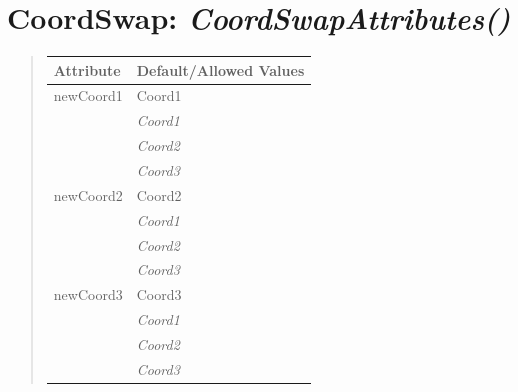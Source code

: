 \documentclass[letterpaper,10pt,english]{sphinxmanual}
\begin{document}
\section{\textbf{CoordSwap}: \emph{CoordSwapAttributes()}}
\label{attributes:coordswap-coordswapattributes}
\begin{DUlineblock}{0em}
\item[] 
\end{DUlineblock}
\begin{quote}

\begin{tabulary}{\linewidth}{|L|L|}
\hline

\textbf{Attribute}
 & 
\textbf{Default/Allowed Values}
\\
\hline
newCoord1
 & 
Coord1
\\
\hline & 
\emph{Coord1}
\\
\hline & 
\emph{Coord2}
\\
\hline & 
\emph{Coord3}
\\
\hline
newCoord2
 & 
Coord2
\\
\hline & 
\emph{Coord1}
\\
\hline & 
\emph{Coord2}
\\
\hline & 
\emph{Coord3}
\\
\hline
newCoord3
 & 
Coord3
\\
\hline & 
\emph{Coord1}
\\
\hline & 
\emph{Coord2}
\\
\hline & 
\emph{Coord3}
\\
\hline\end{tabulary}

\end{quote}

\begin{DUlineblock}{0em}
\item[] 
\end{DUlineblock}

\begin{DUlineblock}{0em}
\item[] 
\end{DUlineblock}
\end{document}
